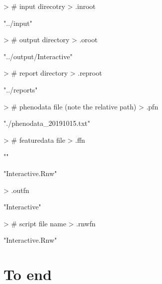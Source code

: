 \documentclass[a4paper,12pt]{article}\usepackage[]{graphicx}\usepackage[]{color}
\begin{document}
\begin{Schunk}
\begin{Sinput}
> # input direcotry
> .inroot
\end{Sinput}
\begin{Soutput}
[1] "../input"
\end{Soutput}
\begin{Sinput}
> # output directory
> .oroot
\end{Sinput}
\begin{Soutput}
[1] "../output/Interactive"
\end{Soutput}
\begin{Sinput}
> # report directory
> .reproot
\end{Sinput}
\begin{Soutput}
[1] "../reports"
\end{Soutput}
\begin{Sinput}
> # phenodata file (note the relative path)
> .pfn
\end{Sinput}
\begin{Soutput}
[1] "./phenodata_20191015.txt"
\end{Soutput}
\begin{Sinput}
> # featuredata file
> .ffn
\end{Sinput}
\begin{Soutput}
[1] ""
\end{Soutput}
\begin{Soutput}
[1] "Interactive.Rnw"
\end{Soutput}
\begin{Sinput}
> .outfn
\end{Sinput}
\begin{Soutput}
[1] "Interactive"
\end{Soutput}
\begin{Sinput}
> # script file name
> .rnwfn
\end{Sinput}
\begin{Soutput}
[1] "Interactive.Rnw"
\end{Soutput}
\end{Schunk}



\clearpage
\section{To end}
\end{document}
